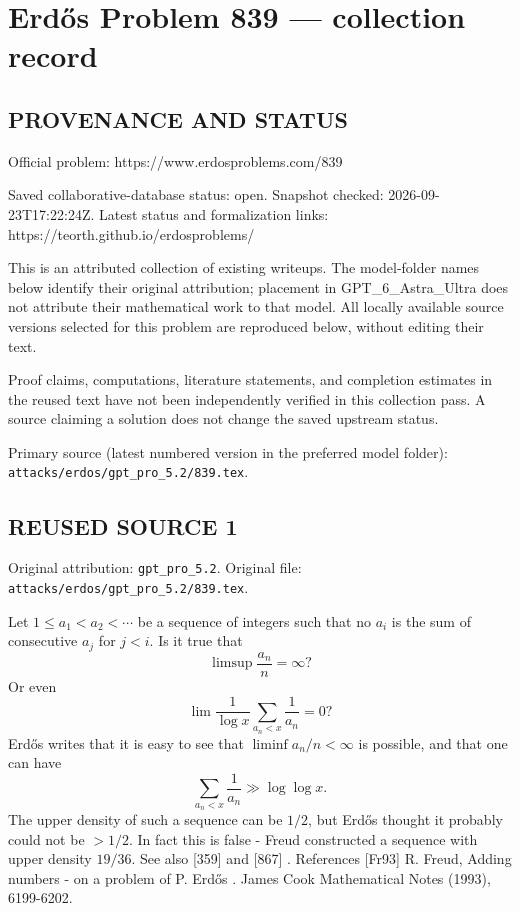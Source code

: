 \section*{Erd\H{o}s Problem 839 --- collection record}

\subsection*{PROVENANCE AND STATUS}
Official problem: https://www.erdosproblems.com/839

Saved collaborative-database status: open.
Snapshot checked: 2026-09-23T17:22:24Z.
Latest status and formalization links: https://teorth.github.io/erdosproblems/

This is an attributed collection of existing writeups. The model-folder names below identify their original attribution; placement in GPT\_6\_Astra\_Ultra does not attribute their mathematical work to that model. All locally available source versions selected for this problem are reproduced below, without editing their text.

Proof claims, computations, literature statements, and completion estimates in the reused text have not been independently verified in this collection pass. A source claiming a solution does not change the saved upstream status.

Primary source (latest numbered version in the preferred model folder): \texttt{attacks/erdos/gpt\_pro\_5.2/839.tex}.

\subsection*{REUSED SOURCE 1}
Original attribution: \texttt{gpt\_pro\_5.2}.
Original file: \texttt{attacks/erdos/gpt\_pro\_5.2/839.tex}.


Let $1\leq a_1<a_2<\cdots$ be a sequence of integers such that no $a_i$ is the sum of consecutive $a_j$ for $j<i$. Is it true that\[\limsup \frac{a_n}{n}=\infty?\]Or even\[\lim \frac{1}{\log x}\sum_{a_n<x}\frac{1}{a_n}=0?\] Erd\H{o}s writes that it is easy to see that $\liminf a_n/n<\infty$ is possible, and that one can have\[\sum_{a_n< x}\frac{1}{a_n}\gg \log\log x.\]The upper density of such a sequence can be $1/2$, but Erd\H{o}s thought it probably could not be $>1/2$. In fact this is false - Freud \cite{Fr93} constructed a sequence with upper density $19/36$. See also [359] and [867] . References [Fr93] R. Freud, Adding numbers - on a problem of P. Erd\H{o}s . James Cook Mathematical Notes (1993), 6199-6202.

